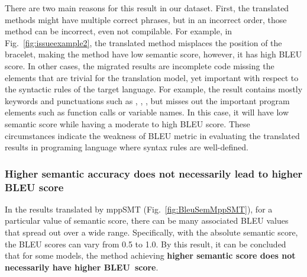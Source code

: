 There are two main reasons for this result in our dataset.  First, the
translated methods might have multiple correct phrases, but in an
incorrect order, those method can be incorrect, even not compilable.
%
For example, in Fig.~\ref{fig:issueexample2}, the translated method
misplaces the position of the bracelet, making the method have low
semantic score, however, it has high BLEU score. 
%
In other cases, the migrated results are incomplete code missing the
elements that are trivial for the translation model, yet important
with respect to the syntactic rules of the target language. For
example, the result contains mostly keywords and punctuations such as
, , \code{()}, but misses out the important
program elements such as function calls or variable names. In this
case, it will have low semantic score while having a moderate to high
BLEU score. These circumstances indicate the weakness of BLEU metric
in evaluating the translated results in programing language where
syntax rules are well-defined.


\subsubsection{{\bf Higher semantic accuracy does not necessarily lead to
higher BLEU score}} In the results translated by mppSMT
(Fig.~\ref{fig:BleuSemMppSMT}), for a particular value of semantic
score, there can be many associated BLEU values that spread out over a
wide range. Specifically, with the absolute semantic score, the BLEU
scores can vary from 0.5 to 1.0. By this result, it
can be concluded that for some models, the method achieving {\bf higher
semantic score does not necessarily have higher BLEU~score}.

